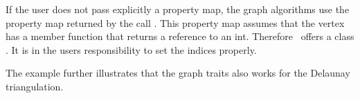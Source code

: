 If the user does not pass explicitly a property map, the graph algorithms
use the property map returned by the call .
This property map assumes that the vertex has a 
member function  that returns a reference to an int.
Therefore \cgal\ offers a class .
It is in the users responsibility to set the indices properly.

The example further illustrates that the graph traits also works
for the Delaunay triangulation.












